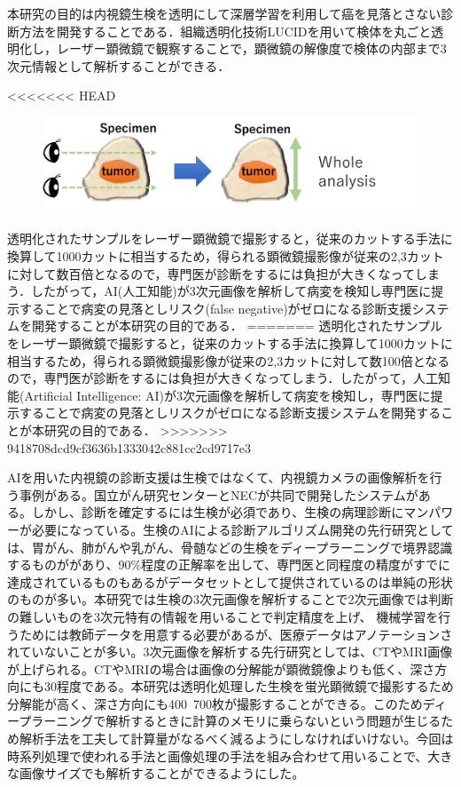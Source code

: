 本研究の目的は内視鏡生検を透明にして深層学習を利用して癌を見落とさない診断方法を開発することである．組織透明化技術LUCIDを用いて検体を丸ごと透明化し，レーザー顕微鏡で観察することで，顕微鏡の解像度で検体の内部まで3次元情報として解析することができる．

<<<<<<< HEAD
\begin{figure}
	\centering
	\includegraphics[width=0.7\linewidth]{fig/chapter1/whole_image_analysis}
	\caption[whole image analysis]{}
	\label{fig:wholeimageanalysis}
\end{figure}


透明化されたサンプルをレーザー顕微鏡で撮影すると，従来のカットする手法に換算して1000カットに相当するため，得られる顕微鏡撮影像が従来の2,3カットに対して数百倍となるので，専門医が診断をするには負担が大きくなってしまう．したがって，AI(人工知能)が3次元画像を解析して病変を検知し専門医に提示することで病変の見落としリスク(false negative)がゼロになる診断支援システムを開発することが本研究の目的である．
=======
透明化されたサンプルをレーザー顕微鏡で撮影すると，従来のカットする手法に換算して1000カットに相当するため，得られる顕微鏡撮影像が従来の2,3カットに対して数100倍となるので，専門医が診断をするには負担が大きくなってしまう．したがって，人工知能(Artificial Intelligence: AI)が3次元画像を解析して病変を検知し，専門医に提示することで病変の見落としリスクがゼロになる診断支援システムを開発することが本研究の目的である．
>>>>>>> 9418708dcd9cf3636b1333042c881cc2cd9717e3

AIを用いた内視鏡の診断支援は生検ではなくて、内視鏡カメラの画像解析を行う事例がある。国立がん研究センターとNECが共同で開発したシステムがある。しかし、診断を確定するには生検が必須であり、生検の病理診断にマンパワーが必要になっている。生検のAIによる診断アルゴリズム開発の先行研究としては、胃がん、肺がんや乳がん、骨髄などの生検をディープラーニングで境界認識するものががあり、90\%程度の正解率を出して、専門医と同程度の精度がすでに達成されているものもあるがデータセットとして提供されているのは単純の形状のものが多い。本研究では生検の3次元画像を解析することで2次元画像では判断の難しいものを3次元特有の情報を用いることで判定精度を上げ、
機械学習を行うためには教師データを用意する必要があるが、医療データはアノテーションされていないことが多い。3次元画像を解析する先行研究としては、CTやMRI画像が上げられる。CTやMRIの場合は画像の分解能が顕微鏡像よりも低く、深さ方向にも30程度である。本研究は透明化処理した生検を蛍光顕微鏡で撮影するため分解能が高く、深さ方向にも400~700枚が撮影することができる。このためディープラーニングで解析するときに計算のメモリに乗らないという問題が生じるため解析手法を工夫して計算量がなるべく減るようにしなければいけない。今回は時系列処理で使われる手法と画像処理の手法を組み合わせて用いることで、大きな画像サイズでも解析することができるようにした。



